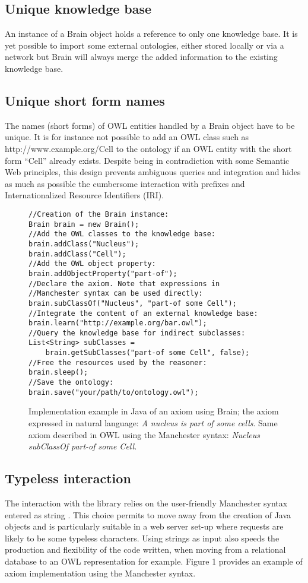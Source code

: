 \documentclass{bioinfo}
\begin{document}
\subsection{Unique knowledge base}
An instance of a Brain object holds a reference to only one knowledge base. It is yet possible to import some external ontologies, either
stored locally or via a network but Brain will always merge the added information to the existing knowledge base.
\subsection{Unique short form names}
The names (short forms) of OWL entities handled by a Brain object have to be unique. It is for instance not possible to add
an OWL class such as http://www.example.org/Cell to the ontology if an OWL entity with the short form ``Cell'' already exists.
Despite being in contradiction with some Semantic Web principles, this design prevents ambiguous queries and integration
and hides as much as possible the cumbersome interaction with prefixes and Internationalized Resource Identifiers (IRI).

\begin{figure}[h]
\begingroup
\fontsize{7pt}{8pt}\selectfont
\begin{Verbatim}[frame=single]
//Creation of the Brain instance:
Brain brain = new Brain();
//Add the OWL classes to the knowledge base:
brain.addClass("Nucleus");
brain.addClass("Cell");
//Add the OWL object property:
brain.addObjectProperty("part-of");
//Declare the axiom. Note that expressions in 
//Manchester syntax can be used directly:
brain.subClassOf("Nucleus", "part-of some Cell");
//Integrate the content of an external knowledge base:
brain.learn("http://example.org/bar.owl");
//Query the knowledge base for indirect subclasses:
List<String> subClasses = 
    brain.getSubClasses("part-of some Cell", false);
//Free the resources used by the reasoner:
brain.sleep();
//Save the ontology:
brain.save("your/path/to/ontology.owl");
\end{Verbatim}
\endgroup
\caption{Implementation example in Java of an axiom using Brain; the axiom expressed in natural language:
 \textit{A nucleus is part of some cells}. Same axiom described in OWL using the Manchester syntax: 
 \textit{Nucleus subClassOf part-of some Cell.}}
\end{figure}
\subsection{Typeless interaction}
The interaction with the library relies on the user-friendly Manchester syntax entered as string \citep{Horridge2006}. 
This choice permits to move away from the creation of Java objects and is particularly suitable in a web server set-up where
requests are likely to be some typeless characters. Using strings as input also speeds the production
and flexibility of the code written, when moving from a relational database to an OWL representation for example. Figure 1 provides
an example of axiom implementation using the Manchester syntax.
\end{document}
